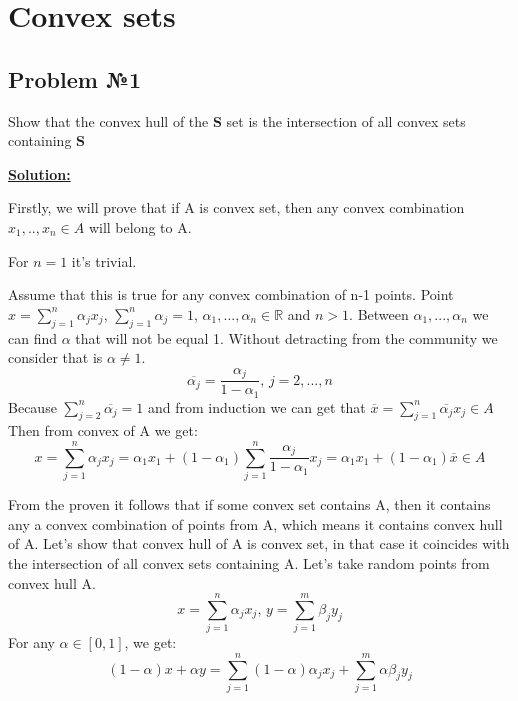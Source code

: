  \section{Convex sets}

\subsection{Problem №1}

Show that the convex hull of the $\mathbf{S}$ set is the intersection of all convex sets containing $\mathbf{S}$

\underline{\textbf{Solution:}}

Firstly, we will prove that if A is convex set, then any convex combination $x_1, .., x_n \in A$ will belong to A.

For $n = 1$ it's trivial.

Assume that this is true for any convex combination of n-1 points. Point $x = \sum\limits_{j=1}^n\alpha_j x_j$, $\sum\limits_{j=1}^n\alpha_j = 1$, $\alpha_1, ..., \alpha_n \in \mathds{R}$ and $n > 1$. Between $\alpha_1, ..., \alpha_n$ we can find $\alpha$ that will not be equal 1. Without detracting from the community we consider that is $\alpha \not = 1$.
\begin{equation*}
    \overline{\alpha_j} = \frac{\alpha_j}{1-\alpha_1}\text{, }j = 2, ..., n
\end{equation*}
Because $    \sum\limits_{j=2}^n\overline{\alpha_j} = 1 $
and from induction we can get that $ \overline{x} = \sum\limits_{j=1}^n\overline{\alpha_j}x_j \in A $
Then from convex of A we get:
\begin{equation*}
    x = \sum\limits_{j=1}^n\alpha_jx_j = \alpha_1x_1 + (1-\alpha_1)\sum\limits_{j=1}^n\frac{\alpha_j}{1-\alpha_1}x_j = \alpha_1 x_1 + (1-\alpha_1)\overline{x} \in A
\end{equation*}

From the proven it follows that if some convex set contains A, then it contains any a convex combination of points from A, which means it contains convex hull of A. Let's show that convex hull of A is convex set, in that case it coincides with the intersection of all convex sets containing A. Let's take random points from convex hull A. 
\begin{equation*}
    x = \sum\limits_{j=1}^n \alpha_jx_j \text{, } y = \sum\limits_{j = 1}^m \beta_jy_j
\end{equation*}
For any $\alpha \in [0, 1]$, we get:
\begin{equation*}
    (1-\alpha)x + \alpha y =\sum\limits_{j=1}^n(1-\alpha)\alpha_jx_j + \sum\limits_{j=1}^m\alpha \beta_j y_j
\end{equation*}


